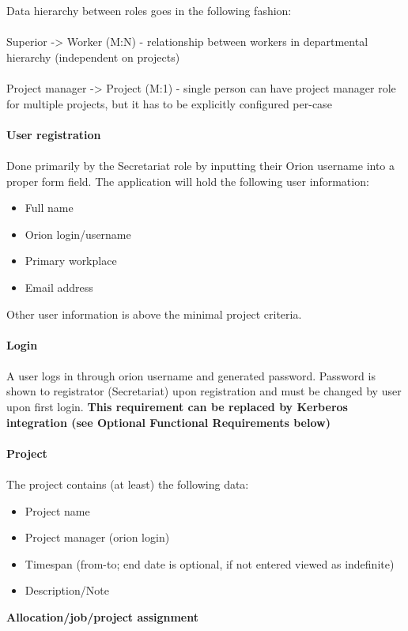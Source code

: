 \documentclass[czech,P5]{thesiskiv}
\begin{document}
Data hierarchy between roles goes in the following fashion: 
\\\\
Superior -> Worker (M:N) - relationship between workers in departmental hierarchy (independent on projects) 
\\\\
Project manager -> Project (M:1) - single person can have project manager role for multiple projects, but it has to be explicitly configured per-case 
\\\\
\textbf{User registration}
\\\\
Done primarily by the Secretariat role by inputting their Orion username into a proper form field. The application will hold the following user information: 
\begin{itemize}
             \item Full name 
             \item Orion login/username 
             \item Primary workplace 
             \item Email address 
\end{itemize}
Other user information is above the minimal project criteria. 
\\\\
\textbf{Login}
\\\\
A user logs in through orion username and generated password. Password is shown to registrator (Secretariat) upon registration and must be changed by user upon first login. \textbf{This requirement can be replaced by Kerberos integration (see Optional Functional Requirements below)}
\\\\
\textbf{Project}
\\\\
The project contains (at least) the following data: 
\begin{itemize}
             \item Project name 
             \item Project manager (orion login) 
             \item Timespan (from-to; end date is optional, if not entered viewed as indefinite) 
             \item Description/Note 
\end{itemize}
\textbf{Allocation/job/project assignment}
\\\\
\end{document}
